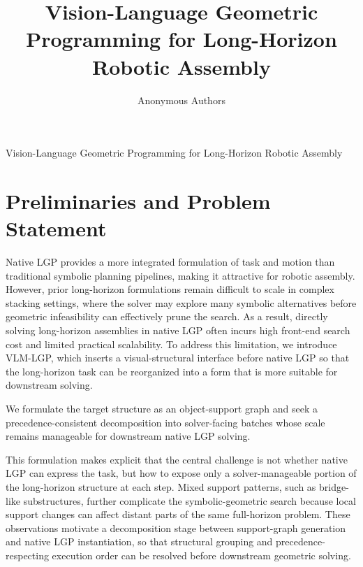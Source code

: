 \documentclass[journal]{IEEEtran}
\begin{document}
  \title{Vision-Language Geometric Programming for Long-Horizon Robotic Assembly}

  \author{Anonymous Authors}

  {Vision-Language Geometric Programming for Long-Horizon Robotic Assembly}

  \maketitle

  \begin{IEEEkeywords}

  \end{IEEEkeywords}

  \IEEEpeerreviewmaketitle

  \section{Preliminaries and Problem Statement}
  \label{sec:preliminaries}

  Native LGP provides a more integrated formulation of task and motion than
  traditional symbolic planning pipelines, making it attractive for robotic assembly.
  However, prior long-horizon formulations remain difficult to scale in complex
  stacking settings, where the solver may explore many symbolic alternatives before
  geometric infeasibility can effectively prune the search. As a result, directly
  solving long-horizon assemblies in native LGP often incurs high front-end search
  cost and limited practical scalability. To address this limitation, we introduce
  VLM-LGP, which inserts a visual-structural interface before native LGP so that the
  long-horizon task can be reorganized into a form that is more suitable for
  downstream solving.

  We formulate the target structure as an object-support graph and seek a
  precedence-consistent decomposition into solver-facing batches whose scale remains
  manageable for downstream native LGP solving.

  This formulation makes explicit that the central challenge is not whether native LGP
  can express the task, but how to expose only a solver-manageable portion of the
  long-horizon structure at each step. Mixed support patterns, such as bridge-like
  substructures, further complicate the symbolic-geometric search because local support
  changes can affect distant parts of the same full-horizon problem. These observations
  motivate a decomposition stage between support-graph generation and native LGP
  instantiation, so that structural grouping and precedence-respecting execution order
  can be resolved before downstream geometric solving.
\end{document}
